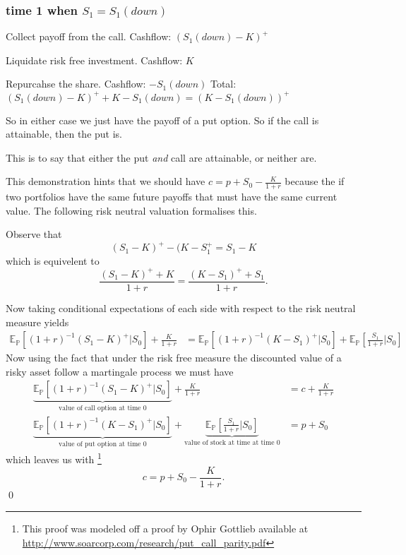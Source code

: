 \documentclass{unswmaths}
\begin{document}
\subsubsection*{time 1 when $ S_1 = S_1(down) $}
Collect payoff from the call.    \hfill Cashflow: $ (S_1(down)-K)^+ $

Liquidate risk free investment. \hfill Cashflow: $ K $

Repurcahse the share.     \hfill Cashflow: $ -S_1(down) $
\hfill Total: $ (S_1(down)-K)^+ + K -S_1(down) = (K - S_1(down))^+ $

So in either case we just have the payoff of a put option. So if the call is attainable,
then the put is. 

This is to say that either the put \emph{and} call are attainable, or neither are.

This demonstration hints that we should have $ c = p + S_0 - \frac{K}{1+r} $ because the
if two portfolios have the same future payoffs that must have the same current value. The
following risk neutral valuation formalises this. 

Observe that
$$
    (S_1 - K)^+ - (K-S_1^+ = S_1 - K
$$
which is equivelent to
$$
    \frac{(S_1 - K)^+ + K}{1+r} = \frac{(K - S_1)^+ + S_1}{1+r}.
$$

Now taking conditional expectations of each side with respect to the risk neutral measure yields
\begin{align*}
    \mathbb{E}_{\mathbb{P}}\left[(1+r)^{-1}(S_1 - K)^+ | S_0 \right] + \frac{K}{1+r}
    &=
    \mathbb{E}_{\mathbb{P}}\left[(1+r)^{-1}(K - S_1)^+ | S_0 \right] + \mathbb{E}_{\mathbb{P}}\left[\frac{S_1}{1+r} | S_0 \right]
\end{align*}
Now using the fact that under the risk free measure the discounted value of a risky asset 
follow a martingale process we must have
\begin{align*}
    \underbrace{\mathbb{E}_{\mathbb{P}}\left[(1+r)^{-1}(S_1 - K)^+ | S_0 \right]}_{\text{ value of call option at time 0 } } + \frac{K}{1+r}
    &=
    c + \frac{K}{1+r} \\
    \underbrace{\mathbb{E}_{\mathbb{P}}\left[(1+r)^{-1}(K - S_1)^+  | S_0 \right]}_{ \text{value of put option at time 0} } + \underbrace{\mathbb{E}_{\mathbb{P}}\left[\frac{S_1}{1+r} | S_0 \right]}_{ \text{value of stock at time at time 0}}
    &=
    p + S_0
\end{align*}
which leaves us with \footnote{ This proof was modeled off a proof by Ophir Gottlieb available at \url{http://www.soarcorp.com/research/put_call_parity.pdf} }
$$
    c = p + S_0 - \frac{K}{1+r}.
$$\qed
\end{document}
